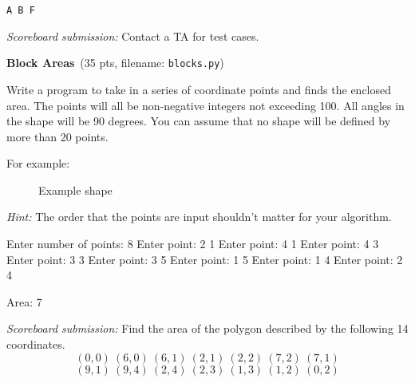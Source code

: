 \documentclass[11pt]{cselabheader}
\newcommand{\cop}[3]{\textbf{#1}~(#2 pts, filename: \texttt{#3})\quad}
\theoremstyle{plain}
\begin{document}
\begin{enumerate}
\begin{minipage}{.33\linewidth}
\begin{minipage}{.8\linewidth}
\begin{lstlisting}[style=bash]
A B F
        \end{lstlisting}
      \end{minipage}
    \end{minipage}

    \textit{Scoreboard submission:} Contact a TA for test cases.

  \item \cop{Block Areas}{35}{blocks.py}

    Write a program to take in a series of coordinate points and finds the 
    enclosed area. The points will all be non-negative integers not 
    exceeding 100. All angles in the shape will be 90 degrees. You can 
    assume that no shape will be defined by more than 20 points. 

    For example:
    \begin{figure}[!ht]
      \centering
      \caption{Example shape}
    \end{figure}

    \emph{Hint:} The order that the points are input shouldn't matter
    for your algorithm.

    \begin{verbatimcode}
Enter number of points: 8
Enter point: 2 1
Enter point: 4 1
Enter point: 4 3
Enter point: 3 3
Enter point: 3 5
Enter point: 1 5
Enter point: 1 4
Enter point: 2 4

Area: 7
    \end{verbatimcode}

    \textit{Scoreboard submission:} Find the area of the polygon described
    by the following 14 coordinates.
    \[
      (0, 0)~(6, 0)~(6, 1)~(2, 1)~(2, 2)~(7, 2)~(7, 1)
    \]
    \[
      (9, 1)~(9, 4)~(2, 4)~(2, 3)~(1, 3)~(1, 2)~(0, 2)
    \]


\end{enumerate}
\end{document}
